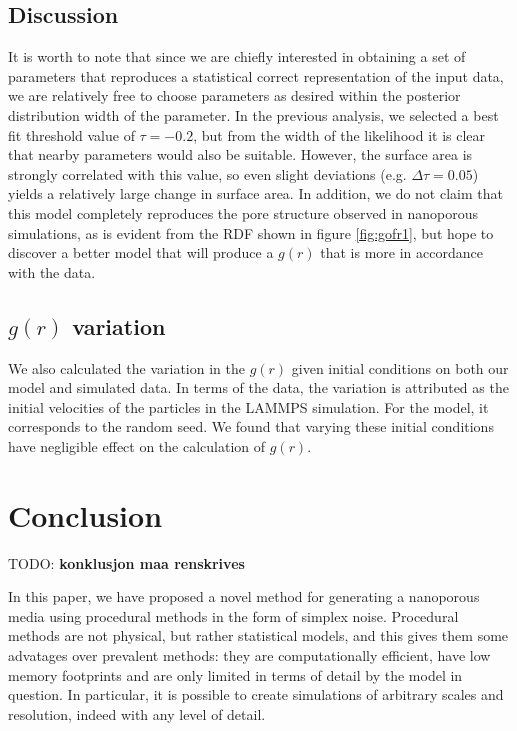 \documentclass[aps,pre,twocolumn,letterpaper,floatfix,showpacs]{revtex4}
\newcommand{\todo}[1]{ {\color{Magenta} TODO: \color{Blue} \textbf{#1} }}
\begin{document}
\subsection{Discussion}
It is worth to note that since we are chiefly interested in obtaining a set of parameters that reproduces a statistical correct representation of the input data, we are relatively free to choose parameters as desired within the posterior distribution width of the parameter.
In the previous analysis, we selected a best fit threshold value of $\tau=-0.2$, but from the width of the likelihood it is clear that nearby parameters would also be suitable. 
However, the surface area is strongly correlated with this value, so even slight deviations (e.g. $\Delta \tau = 0.05$) yields a relatively large change in surface area. 
In addition, we do not claim that this model completely reproduces the pore structure observed in nanoporous simulations, as is evident from the RDF shown in figure \ref{fig:gofr1}, but hope to discover a better model that will produce a $g(r)$ that is more in accordance with the data.

\subsection{$g(r)$ variation}
We also calculated the variation in the $g(r)$ given initial conditions on both our model and simulated data. 
In terms of the data, the variation is attributed as the initial velocities of the particles in the LAMMPS simulation. 
For the model, it corresponds to the random seed. We found that varying these initial conditions have negligible effect on the calculation of $g(r)$.



\section{Conclusion}
\todo{konklusjon maa renskrives}

In this paper, we have proposed a novel method for generating a nanoporous media using procedural methods in the form of simplex noise.
Procedural methods are not physical, but rather statistical models, and this gives them some advatages over prevalent methods: they are computationally efficient, have low memory footprints and are only limited in terms of detail by the model in question. 
In particular, it is possible to create simulations of arbitrary scales and resolution, indeed with any level of detail. 
\end{document}
